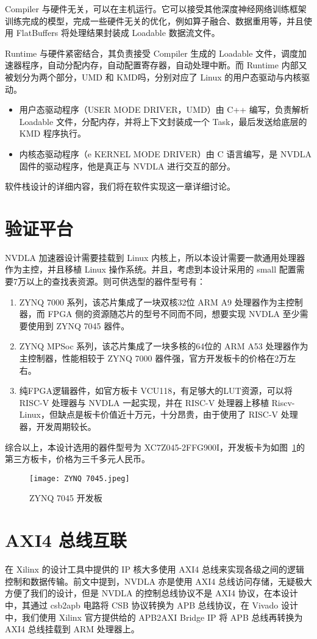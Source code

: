 Compiler 与硬件无关，可以在主机运行。它可以接受其他深度神经网络训练框架训练完成的模型，完成一些硬件无关的优化，例如算子融合、数据重用等，并且使用 FlatBuffers 将处理结果封装成 Loadable 数据流文件。

Runtime 与硬件紧密结合，其负责接受 Compiler 生成的 Loadable 文件，调度加速器程序，自动分配内存，自动配置寄存器，自动处理中断。而 Runtime 内部又被划分为两个部分，UMD 和 KMD吗，分别对应了 Linux 的用户态驱动与内核驱动。

\begin{itemize}
    \item 用户态驱动程序（USER MODE DRIVER，UMD）由 C++ 编写，负责解析 Loadable 文件，分配内存，并将上下文封装成一个 Task，最后发送给底层的 KMD 程序执行。
    \item 内核态驱动程序（e KERNEL MODE DRIVER）由 C 语言编写，是 NVDLA 固件的驱动程序，他是真正与 NVDLA 进行交互的部分。
\end{itemize}

软件栈设计的详细内容，我们将在软件实现这一章详细讨论。

\section{验证平台}

NVDLA 加速器设计需要挂载到 Linux 内核上，所以本设计需要一款通用处理器作为主控，并且移植 Linux 操作系统。并且，考虑到本设计采用的 small 配置需要7万以上的查找表资源。则可供选型的器件型号有：

\begin{enumerate}
    \item ZYNQ 7000 系列，该芯片集成了一块双核32位 ARM A9 处理器作为主控制器，而 FPGA 侧的资源随芯片的型号不同而不同，想要实现 NVDLA 至少需要使用到 ZYNQ 7045 器件。
    \item ZYNQ MPSoc 系列，该芯片集成了一块多核的64位的 ARM A53 处理器作为主控制器，性能相较于 ZYNQ 7000 器件强，官方开发板卡的价格在2万左右。
    \item 纯FPGA逻辑器件，如官方板卡 VCU118，有足够大的LUT资源，可以将 RISC-V 处理器与 NVDLA 一起实现，并在 RISC-V 处理器上移植 Riscv-Linux，但缺点是板卡价值近十万元，十分昂贵，由于使用了 RISC-V 处理器，开发周期较长。
\end{enumerate}

综合以上，本设计选用的器件型号为 XC7Z045-2FFG900I，开发板卡为如图~\ref{fig:ZYNQ 7045}的第三方板卡，价格为三千多元人民币。

\begin{figure}[!htbp]
    \centering
    \texttt{[image: ZYNQ 7045.jpeg]}
    \caption{ZYNQ 7045 开发板}
    \label{fig:ZYNQ 7045}
\end{figure}

\section{AXI4 总线互联}

在 Xilinx 的设计工具中提供的 IP 核大多使用 AXI4 总线来实现各级之间的逻辑控制和数据传输。前文中提到，NVDLA 亦是使用 AXI4 总线访问存储，无疑极大方便了我们的设计，但是 NVDLA 的控制总线协议不是 AXI4 协议，在本设计中，其通过 csb2apb 电路将 CSB 协议转换为 APB 总线协议，在 Vivado 设计中，我们使用 Xilinx 官方提供给的 APB2AXI Bridge IP 将 APB 总线再转换为 AXI4 总线挂载到 ARM 处理器上。

